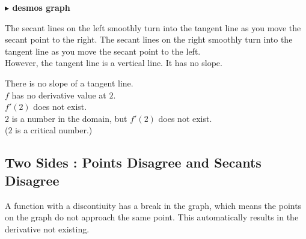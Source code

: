 \documentclass{ximera}
\begin{document}
\textbf{\textcolor{blue!55!black}{$\blacktriangleright$ desmos graph}} 
\begin{center}
\end{center}







The secant lines on the left smoothly turn into the tangent line as you move the secant point to the right. The secant lines on the right smoothly turn into the tangent line as you move the secant point to the left. \\



However, the tangent line is a vertical line.  It has no slope.


There is no slope of a tangent line. \\

$f$ has no derivative value at $2$.  \\

$f'(2)$ does not exist. \\

$2$ is a number in the domain, but $f'(2)$ does not exist. \\

($2$ is a critical number.)



























\subsection*{Two Sides : Points Disagree and Secants Disagree}





A function with a discontiuity has a break in the graph, which means the points on the graph do not approach the same point.  This automatically results in the derivative not existing. \\
\end{document}
